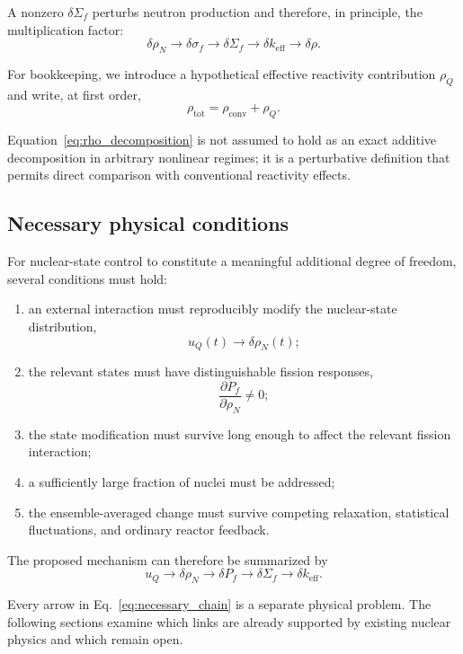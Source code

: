 A nonzero $\delta\Sigma_f$ perturbs neutron production and therefore, in principle, the multiplication factor:
\begin{equation}
\delta\rho_N
\rightarrow
\delta\sigma_f
\rightarrow
\delta\Sigma_f
\rightarrow
\delta k_{\mathrm{eff}}
\rightarrow
\delta\rho.
\end{equation}

For bookkeeping, we introduce a hypothetical effective reactivity contribution $\rho_Q$ and write, at first order,
\begin{equation}
\rho_{\mathrm{tot}}
=
\rho_{\mathrm{conv}}
+
\rho_Q.
\label{eq:rho_decomposition}
\end{equation}

Equation~\eqref{eq:rho_decomposition} is not assumed to hold as an exact additive decomposition in arbitrary nonlinear regimes; it is a perturbative definition that permits direct comparison with conventional reactivity effects.

\subsection{Necessary physical conditions}

For nuclear-state control to constitute a meaningful additional degree of freedom, several conditions must hold:
\begin{enumerate}
\item an external interaction must reproducibly modify the nuclear-state distribution,
\begin{equation}
u_Q(t)\rightarrow\delta\rho_N(t);
\end{equation}
\item the relevant states must have distinguishable fission responses,
\begin{equation}
\frac{\partial P_f}{\partial\rho_N}\neq0;
\end{equation}
\item the state modification must survive long enough to affect the relevant fission interaction;
\item a sufficiently large fraction of nuclei must be addressed;
\item the ensemble-averaged change must survive competing relaxation, statistical fluctuations, and ordinary reactor feedback.
\end{enumerate}

The proposed mechanism can therefore be summarized by
\begin{equation}
\boxed{
u_Q
\rightarrow
\delta\rho_N
\rightarrow
\delta P_f
\rightarrow
\delta\Sigma_f
\rightarrow
\delta k_{\mathrm{eff}}
}.
\label{eq:necessary_chain}
\end{equation}

Every arrow in Eq.~\eqref{eq:necessary_chain} is a separate physical problem. The following sections examine which links are already supported by existing nuclear physics and which remain open.
